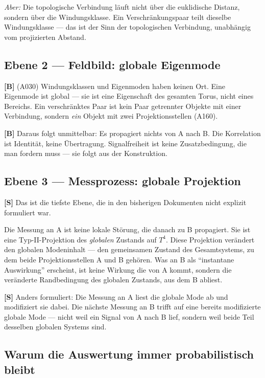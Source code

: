 \emph{Aber:} Die topologische Verbindung läuft nicht über die euklidische
Distanz, sondern über die Windungsklasse. Ein Verschränkungspaar teilt
dieselbe Windungsklasse --- das ist der Sinn der topologischen
Verbindung, unabhängig vom projizierten Abstand.

\subsection{Ebene 2 --- Feldbild: globale Eigenmode}

\textbf{[B]} (A030) Windungsklassen und Eigenmoden haben keinen Ort.
Eine Eigenmode ist global --- sie ist eine Eigenschaft des gesamten
Torus, nicht eines Bereichs. Ein verschränktes Paar ist kein Paar
getrennter Objekte mit einer Verbindung, sondern \emph{ein} Objekt
mit zwei Projektionsstellen (A160).

\textbf{[B]} Daraus folgt unmittelbar: Es propagiert nichts von A
nach B. Die Korrelation ist Identität, keine Übertragung. Signalfreiheit
ist keine Zusatzbedingung, die man fordern muss --- sie folgt aus der
Konstruktion.

\subsection{Ebene 3 --- Messprozess: globale Projektion}

\textbf{[S]} Das ist die tiefste Ebene, die in den bisherigen
Dokumenten nicht explizit formuliert war.

Die Messung an A ist keine lokale Störung, die danach zu B propagiert.
Sie ist eine Typ-II-Projektion des \emph{globalen} Zustands auf $T^4$.
Diese Projektion verändert den globalen Modeninhalt --- den gemeinsamen
Zustand des Gesamtsystems, zu dem beide Projektionsstellen A und B
gehören. Was an B als \enquote{instantane Auswirkung} erscheint, ist
keine Wirkung die von A kommt, sondern die veränderte Randbedingung
des globalen Zustands, aus dem B abliest.

\textbf{[S]} Anders formuliert: Die Messung an A liest die globale
Mode ab und modifiziert sie dabei. Die nächste Messung an B trifft
auf eine bereits modifizierte globale Mode --- nicht weil ein Signal
von A nach B lief, sondern weil beide Teil desselben globalen Systems
sind.

\subsection{Warum die Auswertung immer probabilistisch bleibt}

